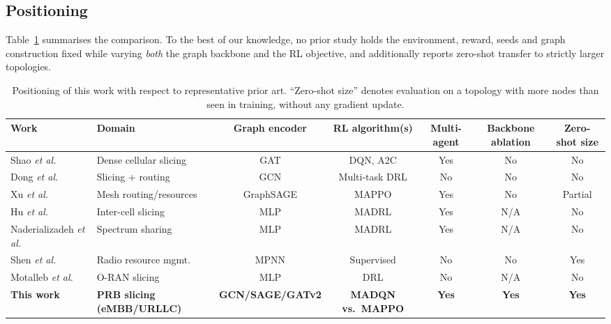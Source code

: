 \documentclass[journal]{IEEEtran}
\begin{document}
\subsection{Positioning}
Table~\ref{tab:related} summarises the comparison. To the best of our
knowledge, no prior study holds the environment, reward, seeds and
graph construction fixed while varying \emph{both} the graph backbone
and the RL objective, and additionally reports zero-shot transfer to
strictly larger topologies.

\begin{table}[!t]
\renewcommand{\arraystretch}{1.25}
\caption{Positioning of this work with respect to representative prior art.
``Zero-shot size'' denotes evaluation on a topology with more nodes than
seen in training, without any gradient update.}
\label{tab:related}
\centering
\footnotesize
\begin{tabular}{@{}llccccc@{}}
\hline
\textbf{Work} & \textbf{Domain} & \textbf{Graph encoder} & \textbf{RL algorithm(s)} & \textbf{Multi-agent} & \textbf{Backbone ablation} & \textbf{Zero-shot size} \\
\hline
Shao \emph{et al.}~\cite{shao2021gat}          & Dense cellular slicing & GAT            & DQN, A2C        & Yes & No  & No  \\
Dong \emph{et al.}~\cite{dong2022gcnslicing}   & Slicing + routing      & GCN            & Multi-task DRL  & No  & No  & No  \\
Xu \emph{et al.}~\cite{xu2026graphsage}        & Mesh routing/resources & GraphSAGE      & MAPPO           & Yes & No  & Partial \\
Hu \emph{et al.}~\cite{hu2022intercell}        & Inter-cell slicing     & MLP      & MADRL           & Yes & N/A & No  \\
Naderializadeh \emph{et al.}~\cite{naderializadeh2021marl} & Spectrum sharing &  MLP & MADRL      & Yes & N/A & No  \\
Shen \emph{et al.}~\cite{shen2021gnnrrm}       & Radio resource mgmt.   & MPNN           & Supervised & No  & No  & Yes \\
Motalleb \emph{et al.}~\cite{motalleb2023oran} & O-RAN slicing          & MLP      & DRL             & No  & N/A & No  \\
\textbf{This work}                             & \textbf{PRB slicing (eMBB/URLLC)} & \textbf{GCN/SAGE/GATv2} & \textbf{MADQN vs.\ MAPPO} & \textbf{Yes} & \textbf{Yes} & \textbf{Yes} \\
\hline
\end{tabular}
\end{table}
\end{document}
